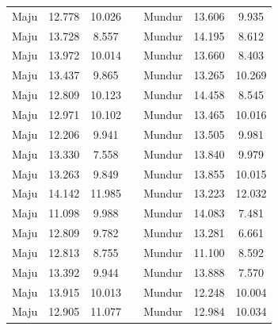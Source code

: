 \begin{longtable}{|c|c|c|c|c|c|c|}
  Maju           & 12.778              & 10.026           &  & Mundur         & 13.606              & 9.935            \\ \cline{1-3} \cline{5-7} 
  Maju           & 13.728              & 8.557            &  & Mundur         & 14.195              & 8.612            \\ \cline{1-3} \cline{5-7} 
  Maju           & 13.972              & 10.014           &  & Mundur         & 13.660              & 8.403            \\ \cline{1-3} \cline{5-7} 
  Maju           & 13.437              & 9.865            &  & Mundur         & 13.265              & 10.269           \\ \cline{1-3} \cline{5-7} 
  Maju           & 12.809              & 10.123           &  & Mundur         & 14.458              & 8.545            \\ \cline{1-3} \cline{5-7} 
  Maju           & 12.971              & 10.102           &  & Mundur         & 13.465              & 10.016           \\ \cline{1-3} \cline{5-7} 
  Maju           & 12.206              & 9.941            &  & Mundur         & 13.505              & 9.981            \\ \cline{1-3} \cline{5-7} 
  Maju           & 13.330              & 7.558            &  & Mundur         & 13.840              & 9.979            \\ \cline{1-3} \cline{5-7} 
  Maju           & 13.263              & 9.849            &  & Mundur         & 13.855              & 10.015           \\ \cline{1-3} \cline{5-7} 
  Maju           & 14.142              & 11.985           &  & Mundur         & 13.223              & 12.032           \\ \cline{1-3} \cline{5-7} 
  Maju           & 11.098              & 9.988            &  & Mundur         & 14.083              & 7.481            \\ \cline{1-3} \cline{5-7} 
  Maju           & 12.809              & 9.782            &  & Mundur         & 13.281              & 6.661            \\ \cline{1-3} \cline{5-7} 
  Maju           & 12.813              & 8.755            &  & Mundur         & 11.100              & 8.592            \\ \cline{1-3} \cline{5-7} 
  Maju           & 13.392              & 9.944            &  & Mundur         & 13.888              & 7.570            \\ \cline{1-3} \cline{5-7} 
  Maju           & 13.915              & 10.013           &  & Mundur         & 12.248              & 10.004           \\ \cline{1-3} \cline{5-7} 
  Maju           & 12.905              & 11.077           &  & Mundur         & 12.984              & 10.034           \\ \cline{1-3} \cline{5-7} 
\end{longtable}


